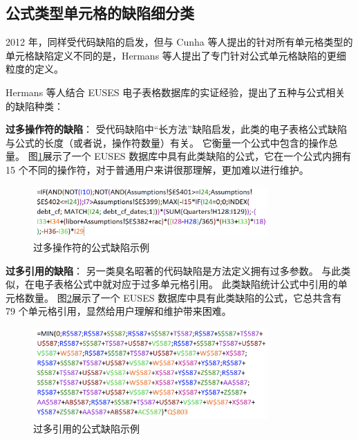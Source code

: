 \subsection{公式类型单元格的缺陷细分类}
2012 年，同样受代码缺陷的启发，但与 Cunha 等人\cite{cunha2012towards}提出的针对所有单元格类型的单元格缺陷定义不同的是，Hermans 等人\cite{hermans2012detecting2,jansen2015code}提出了专门针对公式单元格缺陷的更细粒度的定义。

Hermans 等人结合 EUSES 电子表格数据库\cite{fisher2005euses}的实证经验，提出了五种与公式相关的缺陷种类：

\textbf{过多操作符的缺陷}：
受代码缺陷中“长方法”缺陷\cite{fowler1997refactoring}启发，此类的电子表格公式缺陷与公式的长度（或者说，操作符数量）有关。
它衡量一个公式中包含的操作总量。
图\ref{figure-multipleOperation}展示了一个 EUSES 数据库中具有此类缺陷的公式，它在一个公式内拥有 15 个不同的操作符，对于普通用户来讲很那理解，更加难以进行维护。

\begin{figure}[tbp]    
    \centering
    \includegraphics[width=0.8\textwidth]{figure/relatedwork/multipleOperation.png}
    \caption{过多操作符的公式缺陷示例}
    \label{figure-multipleOperation}
\end{figure}

\textbf{过多引用的缺陷}：
另一类臭名昭著的代码缺陷是方法定义拥有过多参数。
与此类似，在电子表格公式中就对应于过多单元格引用。
此类缺陷统计公式中引用的单元格数量。
图\ref{figure-multipleReference}展示了一个 EUSES 数据库中具有此类缺陷的公式，它总共含有 79 个单元格引用，显然给用户理解和维护带来困难。

\begin{figure}[tbp]    
    \centering
    \includegraphics[width=0.8\textwidth]{figure/relatedwork/multipleReference.png}
    \caption{过多引用的公式缺陷示例}
    \label{figure-multipleReference}
\end{figure}

